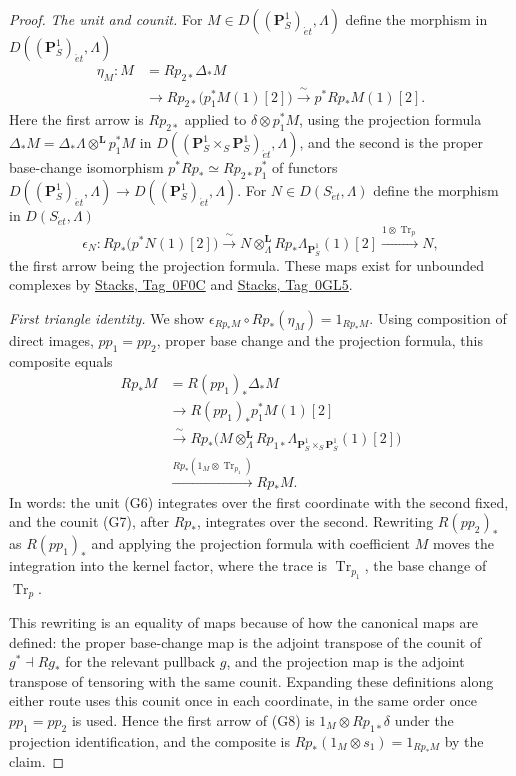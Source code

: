 \documentclass[11pt,a4paper]{article}
\numberwithin{equation}{section}
\theoremstyle{definition}
\theoremstyle{remark}
\newcommand{\et}{\acute{e}t}
\newcommand{\stacks}[1]{\href{https://stacks.math.columbia.edu/tag/#1}{\textnormal{Stacks, Tag~#1}}}
\begin{document}
\begin{proof}
\emph{The unit and counit.} For \(M\in D((\mathbf P^1_S)_{\et},\Lambda)\)
define the morphism in \(D((\mathbf P^1_S)_{\et},\Lambda)\)
\[
 \begin{split}
 \eta_M:M
 &=Rp_{2*}\Delta_*M\\
 &\longrightarrow Rp_{2*}\bigl(p_1^*M(1)[2]\bigr)
   \xrightarrow{\ \sim\ }p^*Rp_*M(1)[2] .
 \end{split}                                                    \tag{G6}
\]
Here the first arrow is \(Rp_{2*}\) applied to \(\delta\otimes p_1^*M\),
using the projection formula
\(\Delta_*M=\Delta_*\Lambda\otimes^{\mathbf L}p_1^*M\) in
\(D((\mathbf P^1_S\times_S\mathbf P^1_S)_{\et},\Lambda)\), and the second
is the proper base-change isomorphism \(p^*Rp_*\simeq Rp_{2*}p_1^*\) of
functors \(D((\mathbf P^1_S)_{\et},\Lambda)\to
D((\mathbf P^1_S)_{\et},\Lambda)\). For \(N\in D(S_{\et},\Lambda)\)
define the morphism in \(D(S_{\et},\Lambda)\)
\[
 \epsilon_N:Rp_*\bigl(p^*N(1)[2]\bigr)
   \xrightarrow{\ \sim\ }N\otimes_\Lambda^{\mathbf L}
                       Rp_*\Lambda_{\mathbf P^1_S}(1)[2]
   \xrightarrow{1\otimes \operatorname{Tr}_p}N,                        \tag{G7}
\]
the first arrow being the projection formula. These maps exist for
unbounded complexes by \stacks{0F0C} and \stacks{0GL5}.

\emph{First triangle identity.} We show
\(\epsilon_{Rp_*M}\circ Rp_*(\eta_M)=1_{Rp_*M}\). Using composition of
direct images, \(pp_1=pp_2\), proper base change and the projection
formula, this composite equals
\[
 \begin{split}
 Rp_*M
 &=R(pp_1)_*\Delta_*M\\
 &\longrightarrow R(pp_1)_*p_1^*M(1)[2]\\
 &\xrightarrow{\ \sim\ }
       Rp_*\bigl(M\otimes_\Lambda^{\mathbf L}
                       Rp_{1*}\Lambda_{\mathbf P^1_S\times_S\mathbf P^1_S}(1)[2]\bigr)\\
 &\xrightarrow{Rp_*(1_M\otimes \operatorname{Tr}_{p_1})}Rp_*M .
 \end{split}                                                    \tag{G8}
\]
In words: the unit (G6) integrates over the first coordinate with the
second fixed, and the counit (G7), after \(Rp_*\), integrates over the
second. Rewriting \(R(pp_2)_*\) as \(R(pp_1)_*\) and applying the
projection formula with coefficient \(M\) moves the integration into the
kernel factor, where the trace is \(\operatorname{Tr}_{p_1}\), the base
change of \(\operatorname{Tr}_p\).

This rewriting is an equality of maps because of how the canonical maps
are defined: the proper base-change
map is the adjoint transpose of the counit of \(g^*\dashv Rg_*\) for the
relevant pullback \(g\), and the projection map is the adjoint transpose
of tensoring with the same counit. Expanding these definitions along
either route uses this counit once in each coordinate, in the same
order once \(pp_1=pp_2\) is used. Hence the first arrow of (G8) is
\(1_M\otimes Rp_{1*}\delta\) under the projection identification, and
the composite is \(Rp_*(1_M\otimes s_1)=1_{Rp_*M}\) by the claim.


\end{proof}
\end{document}

